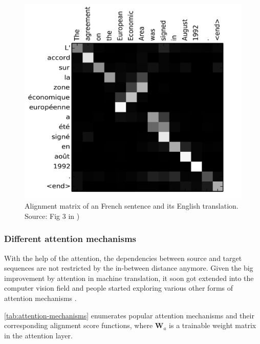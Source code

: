 \begin{figure}[hpt]
	\centering
	\includegraphics[scale=0.3]{images/ch3/alignment-matrix.png}
	\caption{Alignment matrix of an French sentence and its English translation. Source: Fig 3 in \citep{Bahdanau2015})}
	\label{fig:alignment-matrix}
\end{figure}

\subsubsection{Different attention mechanisms}

With the help of the attention, the dependencies between source and target sequences are not restricted by the in-between distance anymore. Given the big improvement by attention in machine translation, it soon got extended into the computer vision field \citep{Xu2015} and people started exploring various other forms of attention mechanisms \citep{Luong2015, Britz2017, Vaswani2017}.

\cref{tab:attention-mechanisms} enumerates popular attention mechanisms and their corresponding alignment score functions, where $\mathbf{W}_a$ is a trainable weight matrix in the attention layer. 

